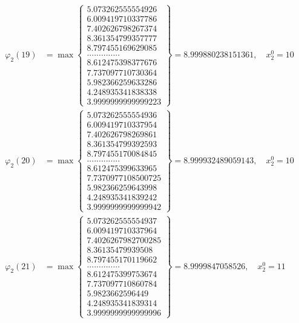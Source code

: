 \documentclass{article}
\begin{document}
\begin{align*}
  
  
  
\varphi_{2}(19) &= \max \left\{ \begin{array}{c}
5.073262555554926 \\
 6.009419710337786 \\
 7.402626798267374 \\
 8.361354799357777 \\
 8.797455169629085 \\
 .............. \\
 8.612475398377676 \\
 7.737097710730364 \\
 5.982366259633286 \\
 4.248935341838338 \\
 3.9999999999999223
\end{array} \right\} = 8.999880238151361, \quad x_{2}^0 = 10\\
  
  
  
  
\varphi_{2}(20) &= \max \left\{ \begin{array}{c}
5.073262555554936 \\
 6.009419710337954 \\
 7.402626798269861 \\
 8.361354799392593 \\
 8.797455170084845 \\
 .............. \\
 8.612475399633965 \\
 7.7370977108500725 \\
 5.982366259643998 \\
 4.248935341839242 \\
 3.9999999999999942
\end{array} \right\} = 8.999932489059143, \quad x_{2}^0 = 10\\
  
  
  
  
\varphi_{2}(21) &= \max \left\{ \begin{array}{c}
5.073262555554937 \\
 6.009419710337964 \\
 7.4026267982700285 \\
 8.36135479939508 \\
 8.797455170119662 \\
 .............. \\
 8.612475399753674 \\
 7.737097710860784 \\
 5.9823662596449 \\
 4.248935341839314 \\
 3.9999999999999996
\end{array} \right\} = 8.9999847058526, \quad x_{2}^0 = 11\\
  

\end{align*}
\end{document}
